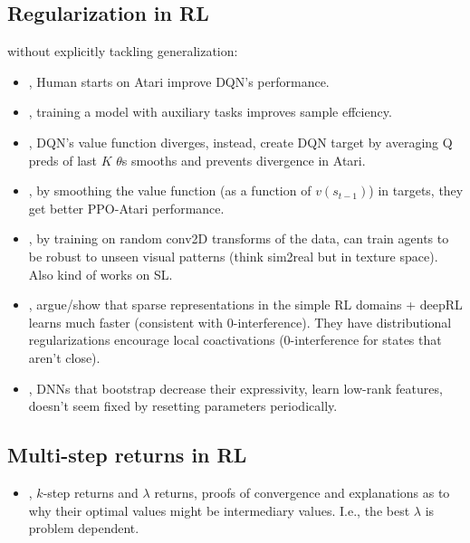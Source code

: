 \subsection{Regularization in RL}
without explicitly tackling generalization:
\begin{itemize}
  \item \citet{nair2015massively}, Human starts on Atari improve DQN's performance.
  \item \citet{jaderberg2016reinforcement}, training a model with auxiliary tasks improves sample effciency.
  \item \citet{anschel2017averaged}, DQN's value function diverges, instead, create DQN target by averaging Q preds of last $K$ $\theta$s smooths and prevents divergence in Atari.
  \item \citet{thodoroff2018temporal}, by smoothing the value function (as a function of $v(s_{t-1})$) in targets, they get better PPO-Atari performance.
  \item \citet{lee2019simple}, by training on random conv2D transforms of the data, can train agents to be robust to unseen visual patterns (think sim2real but in texture space). Also kind of works on SL.
  \item \citet{liu2019utility}, argue/show that sparse representations in the simple RL domains + deepRL learns much faster (consistent with 0-interference). They have distributional regularizations encourage local coactivations (0-interference for states that aren't close).
  \item \citet{kumar2020implicit}, DNNs that bootstrap decrease their expressivity, learn low-rank features, doesn't seem fixed by resetting parameters periodically.
    
\end{itemize}

\subsection{Multi-step returns in RL}
\begin{itemize}
  \item \citet{kearns2000bias}, $k$-step returns and $\lambda$ returns, proofs of convergence and explanations as to why their optimal values might be intermediary values. I.e., the best $\lambda$ is problem dependent.
\end{itemize}

